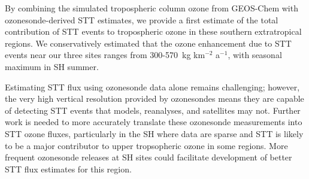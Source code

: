 \documentclass[acp, manuscript]{copernicus} %
\begin{document}
By combining the simulated tropospheric column ozone from GEOS-Chem with ozonesonde-derived STT estimates, we provide a first estimate of the total contribution of STT events to tropospheric ozone in these southern extratropical regions.
We conservatively estimated that the ozone enhancement due to STT events near our three sites ranges from 300-570~kg km$^{-2}$ a$^{-1}$, with seasonal maximum in SH summer.

Estimating STT flux using ozonesonde data alone remains challenging; however, the very high vertical resolution provided by ozonesondes means they are capable of detecting STT events that models, reanalyses, and satellites may not. 
Further work is needed to more accurately translate these ozonesonde measurements into STT ozone fluxes, particularly in the SH where data are sparse and STT is likely to be a major contributor to upper tropsopheric ozone in some regions.
More frequent ozonesonde releases at SH sites could facilitate development of better STT flux estimates for this region.

\appendix

\appendixfigures  %
\appendixtables   %

\end{document}
